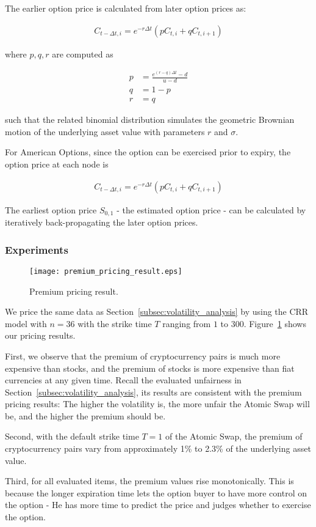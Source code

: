 The earlier option price is calculated from later option prices as:

\begin{align} 
C_{t - \Delta t, i} = e^{-r \Delta t} (p C_{t, i} + q C_{t, i+1})
\end{align}

where $p, q, r$ are computed as


\begin{align} 
p &= \frac{e^{(r-q)\Delta t} - d}{u - d}\\
q &= 1 - p\\
r &= q
\end{align}

such that the related binomial distribution simulates the geometric Brownian motion of the underlying asset value with parameters $r$ and $\sigma$.

For American Options, since the option can be exercised prior to expiry, the option price at each node is

\begin{align}
C_{t - \Delta t, i} = e^{-r \Delta t} (p C_{t, i} + q C_{t, i+1})
\end{align}

The earliest option price $S_{0, 1}$ - the estimated option price - can be calculated by iteratively back-propagating the later option prices. 

\subsubsection{Experiments}


\begin{figure}
    \texttt{[image: premium\_pricing\_result.eps]}
    \caption{Premium pricing result. }
    \label{fig:premium_pricing_result}
\end{figure}

We price the same data as Section~\ref{subsec:volatility_analysis} by using the CRR model with $n = 36$ with the strike time $T$ ranging from $1$ to $300$.
Figure~\ref{fig:premium_pricing_result} shows our pricing results.

First, we observe that the premium of cryptocurrency pairs is much more expensive than stocks, and the premium of stocks is more expensive than fiat currencies at any given time.
Recall the evaluated unfairness in Section~\ref{subsec:volatility_analysis}, its results are consistent with the premium pricing results: The higher the volatility is, the more unfair the Atomic Swap will be, and the higher the premium should be.

Second, with the default strike time $T = 1$ of the Atomic Swap, the premium of cryptocurrency pairs vary from approximately 1\% to 2.3\% of the underlying asset value.

Third, for all evaluated items, the premium values rise monotonically.
This is because the longer expiration time lets the option buyer to have more control on the option - He has more time to predict the price and judges whether to exercise the option.